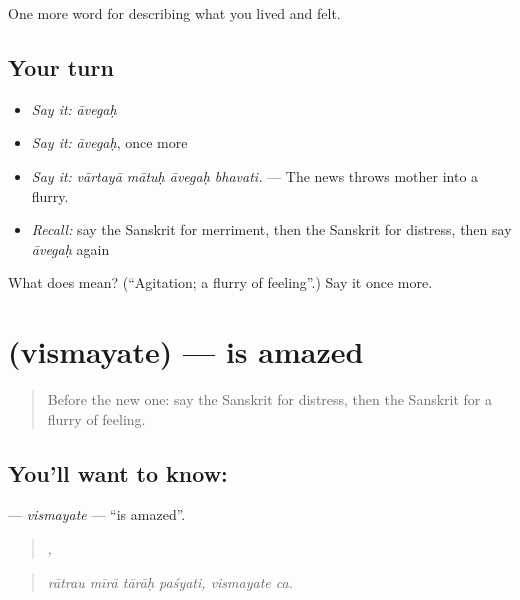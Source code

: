 \begin{grammarlens}[title={What you've built}]
One more word for describing what you lived and felt.
\end{grammarlens}

\subsection*{Your turn}
\begin{itemize}
\raggedright
  \item \emph{Say it:} \emph{āvegaḥ}
  \item \emph{Say it:} \emph{āvegaḥ}, once more
  \item \emph{Say it:} \emph{vārtayā mātuḥ āvegaḥ bhavati.} — The news throws mother into a flurry.
  \item \emph{Recall:} say the Sanskrit for merriment, then the Sanskrit for distress, then say \emph{āvegaḥ} again
\end{itemize}

\begin{tcolorbox}[breakable,colback=teal!4,colframe=teal!35!black,title={Before you move on}]
What does  mean? (\textquotedblleft{}Agitation; a flurry of feeling\textquotedblright{}.) Say it once more.
\end{tcolorbox}
\section[\texorpdfstring{\sk{विस्मयते} (vismayate)}{विस्मयते (vismayate)}]{ (vismayate) — is amazed}

\label{lesson:SA-C449-vismayate}



\begin{quote}
Before the new one: say the Sanskrit for distress, then the Sanskrit for a flurry of feeling.
\end{quote}

\subsection*{You'll want to know: }
\textbf{} — \emph{vismayate} — \textquotedblleft{}is amazed\textquotedblright{}.

\begin{quote}
   ,  
\end{quote}

\begin{quote}
\emph{rātrau mīrā tārāḥ paśyati, vismayate ca.}
\end{quote}

